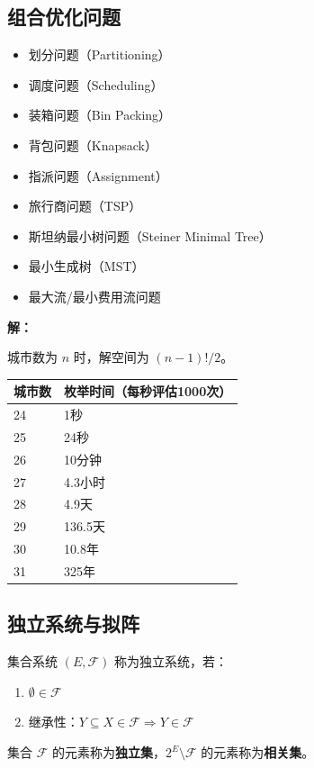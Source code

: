 \subsection{组合优化问题}

\begin{conceptbox}[经典组合优化问题]
\begin{itemize}[itemsep=0.2em]
    \item 划分问题（Partitioning）
    \item 调度问题（Scheduling）
    \item 装箱问题（Bin Packing）
    \item 背包问题（Knapsack）
    \item 指派问题（Assignment）
    \item 旅行商问题（TSP）
    \item 斯坦纳最小树问题（Steiner Minimal Tree）
    \item 最小生成树（MST）
    \item 最大流/最小费用流问题
\end{itemize}
\end{conceptbox}

\begin{example}[TSP问题的计算复杂度]
\textbf{解：}

城市数为 $n$ 时，解空间为 $(n-1)!/2$。

\begin{table}[htbp]
\centering
\begin{tabular}{@{}ll@{}}
\toprule
\textbf{城市数} & \textbf{枚举时间}（每秒评估1000次） \\
\midrule
24 & 1秒 \\
25 & 24秒 \\
26 & 10分钟 \\
27 & 4.3小时 \\
28 & 4.9天 \\
29 & 136.5天 \\
30 & 10.8年 \\
31 & 325年 \\
\bottomrule
\end{tabular}
\end{table}
\end{example}

\subsection{独立系统与拟阵}

\begin{definition}[独立系统]
集合系统 $(E, \mathcal{F})$ 称为独立系统，若：
\begin{enumerate}[label=(\arabic*)]
    \item $\emptyset \in \mathcal{F}$
    \item 继承性：$Y \subseteq X \in \mathcal{F} \Rightarrow Y \in \mathcal{F}$
\end{enumerate}
集合 $\mathcal{F}$ 的元素称为\textbf{独立集}，$2^E \setminus \mathcal{F}$ 的元素称为\textbf{相关集}。
\end{definition}

